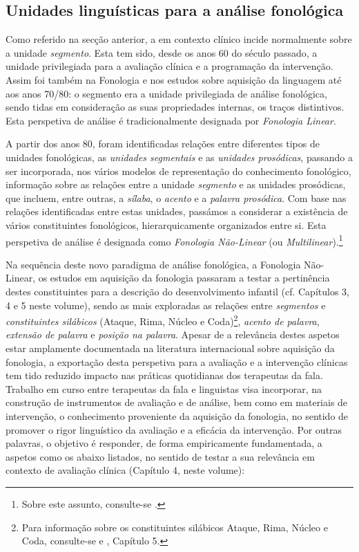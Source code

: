 \documentclass[output=paper]{LSP/langsci}
\begin{document}
\subsection{Unidades linguísticas para a análise fonológica}
\label{subsec:lousada_unidades}

Como referido na secção anterior, a  em contexto clínico incide normalmente sobre a unidade \textit{segmento}. Esta tem sido, desde os anos 60 do século passado, a unidade privilegiada para a avaliação clínica e a programação da intervenção. Assim foi também na Fonologia e nos estudos sobre aquisição da linguagem até aos anos 70/80: o segmento era a unidade privilegiada de análise fonológica, sendo tidas em consideração as suas propriedades internas, os traços distintivos. Esta perspetiva de análise é tradicionalmente designada por \textit{Fonologia Linear}. 

A partir dos anos 80, foram identificadas relações entre diferentes tipos de unidades fonológicas, as \textit{unidades segmentais} e as \textit{unidades prosódicas}, passando a ser incorporada, nos vários modelos de representação do conhecimento fonológico, informação sobre as relações entre a unidade \textit{segmento} e as unidades prosódicas, que incluem, entre outras, a \textit{sílaba}, o \textit{acento} e a \textit{palavra prosódica}. Com base nas relações identificadas entre estas unidades, passámos a considerar a existência de vários constituintes fonológicos, hierarquicamente organizados entre si. Esta perspetiva de análise é designada como \textit{Fonologia Não-Linear} (ou \textit{Multilinear}).\footnote{Sobre este assunto, consulte-se \citet{mateus_etal2005}.}

Na sequência deste novo paradigma de análise fonológica, a Fonologia Não-Linear, os estudos em aquisição da fonologia passaram a testar a pertinência destes constituintes para a descrição do desenvolvimento infantil (cf. Capítulos 3, 4 e 5 neste volume), sendo as mais exploradas as relações entre \textit{segmentos} e \textit{constituintes silábicos} (Ataque, Rima, Núcleo e Coda)\footnote{Para informação sobre os constituintes silábicos Ataque, Rima, Núcleo e Coda, consulte-se \citet{mateus_etal2005} e \citet{freitassantos2001}, Capítulo 5.}, \textit{acento de palavra}, \textit{extensão de palavra} e \textit{posição na palavra}. Apesar de a relevância destes aspetos estar amplamente documentada na literatura internacional sobre aquisição da fonologia, a exportação desta perspetiva para a avaliação e a intervenção clínicas \citep{bernhardtstemberger2000} tem tido reduzido impacto nas práticas quotidianas dos terapeutas da fala. Trabalho em curso entre terapeutas da fala e linguistas visa incorporar, na construção de instrumentos de avaliação e de análise, bem como em materiais de intervenção, o conhecimento proveniente da aquisição da fonologia, no sentido de promover o rigor linguístico da avaliação e a eficácia da intervenção. Por outras palavras, o objetivo é responder, de forma empiricamente fundamentada, a aspetos como os abaixo listados, no sentido de testar a sua relevância em contexto de avaliação clínica (Capítulo 4, neste volume):
\end{document}
